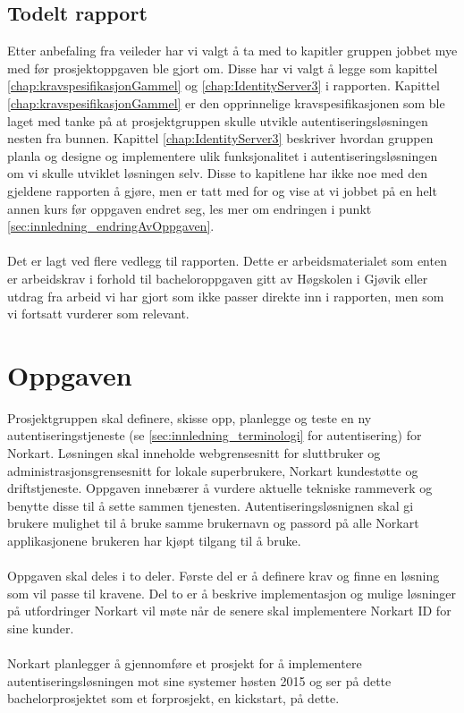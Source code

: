 \subsection*{Todelt rapport}
Etter anbefaling fra veileder har vi valgt å ta med to kapitler gruppen jobbet mye med før prosjektoppgaven ble gjort om. Disse har vi valgt å legge som kapittel \ref{chap:kravspesifikasjonGammel} og \ref{chap:IdentityServer3} i rapporten. Kapittel \ref{chap:kravspesifikasjonGammel} er den opprinnelige kravspesifikasjonen som ble laget med tanke på at prosjektgruppen skulle utvikle autentiseringsløsningen nesten fra bunnen. Kapittel \ref{chap:IdentityServer3} beskriver hvordan gruppen planla og designe og implementere ulik funksjonalitet i autentiseringsløsningen om vi skulle utviklet løsningen selv. Disse to kapitlene har ikke noe med den gjeldene rapporten å gjøre, men er tatt med for og vise at vi jobbet på en helt annen kurs før oppgaven endret seg, les mer om endringen i punkt \ref{sec:innledning_endringAvOppgaven}.
\\
\\
Det er lagt ved flere vedlegg til rapporten. Dette er arbeidsmaterialet som enten er arbeidskrav i forhold til bacheloroppgaven gitt av Høgskolen i Gjøvik eller utdrag fra arbeid vi har gjort som ikke passer direkte inn i rapporten, men som vi fortsatt vurderer som relevant.

\section{Oppgaven}
\label{sec:innledning_oppgaven}
Prosjektgruppen skal definere, skisse opp, planlegge og teste en ny autentiseringstjeneste (se  \ref{sec:innledning_terminologi} for autentisering) for Norkart. Løsningen skal inneholde webgrensesnitt for sluttbruker og administrasjonsgrensesnitt for lokale superbrukere, Norkart kundestøtte og driftstjeneste. Oppgaven innebærer å vurdere aktuelle tekniske rammeverk og benytte disse til å sette sammen tjenesten. Autentiseringsløsnignen skal gi brukere mulighet til å bruke samme brukernavn og passord på alle Norkart applikasjonene brukeren har kjøpt tilgang til å bruke.
\\
\\
Oppgaven skal deles i to deler. Første del er å definere krav og finne en løsning som vil passe til kravene. Del to er å beskrive implementasjon og mulige løsninger på utfordringer Norkart vil møte når de senere skal implementere Norkart ID for sine kunder.
\\
\\
Norkart planlegger å gjennomføre et prosjekt for å implementere autentiseringsløsningen mot sine systemer høsten 2015 og ser på dette bachelorprosjektet som et forprosjekt, en kickstart, på dette.

